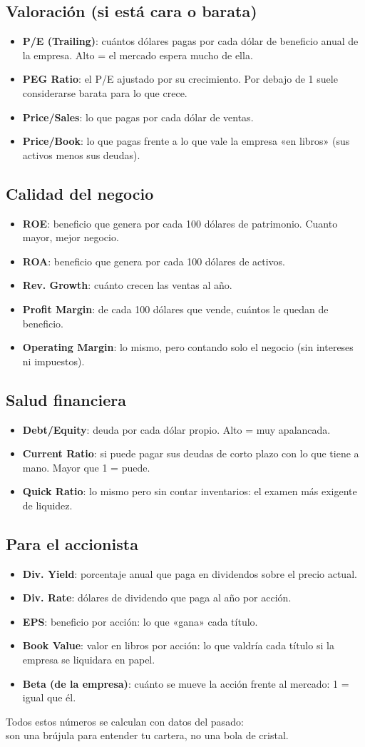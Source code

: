 \documentclass[11pt,a4paper]{article}
\newcommand{\dato}[2]{\item \textbf{#1}: #2}
\begin{document}
\subsection{Valoración (si está cara o barata)}
\begin{itemize}
  \dato{P/E (Trailing)}{cuántos dólares pagas por cada dólar de beneficio anual de la empresa. Alto = el mercado espera mucho de ella.}
  \dato{PEG Ratio}{el P/E ajustado por su crecimiento. Por debajo de 1 suele considerarse barata para lo que crece.}
  \dato{Price/Sales}{lo que pagas por cada dólar de ventas.}
  \dato{Price/Book}{lo que pagas frente a lo que vale la empresa «en libros» (sus activos menos sus deudas).}
\end{itemize}

\subsection{Calidad del negocio}
\begin{itemize}
  \dato{ROE}{beneficio que genera por cada 100 dólares de patrimonio. Cuanto mayor, mejor negocio.}
  \dato{ROA}{beneficio que genera por cada 100 dólares de activos.}
  \dato{Rev. Growth}{cuánto crecen las ventas al año.}
  \dato{Profit Margin}{de cada 100 dólares que vende, cuántos le quedan de beneficio.}
  \dato{Operating Margin}{lo mismo, pero contando solo el negocio (sin intereses ni impuestos).}
\end{itemize}

\subsection{Salud financiera}
\begin{itemize}
  \dato{Debt/Equity}{deuda por cada dólar propio. Alto = muy apalancada.}
  \dato{Current Ratio}{si puede pagar sus deudas de corto plazo con lo que tiene a mano. Mayor que 1 = puede.}
  \dato{Quick Ratio}{lo mismo pero sin contar inventarios: el examen más exigente de liquidez.}
\end{itemize}

\subsection{Para el accionista}
\begin{itemize}
  \dato{Div. Yield}{porcentaje anual que paga en dividendos sobre el precio actual.}
  \dato{Div. Rate}{dólares de dividendo que paga al año por acción.}
  \dato{EPS}{beneficio por acción: lo que «gana» cada título.}
  \dato{Book Value}{valor en libros por acción: lo que valdría cada título si la empresa se liquidara en papel.}
  \dato{Beta (de la empresa)}{cuánto se mueve la acción frente al mercado: 1 = igual que él.}
\end{itemize}

\vspace{1.2em}
\begin{center}
\colorbox{accent}{\parbox{0.92\textwidth}{\color{white}\centering
Todos estos números se calculan con datos del pasado:\\
son una brújula para entender tu cartera, no una bola de cristal.}}
\end{center}
\end{document}
